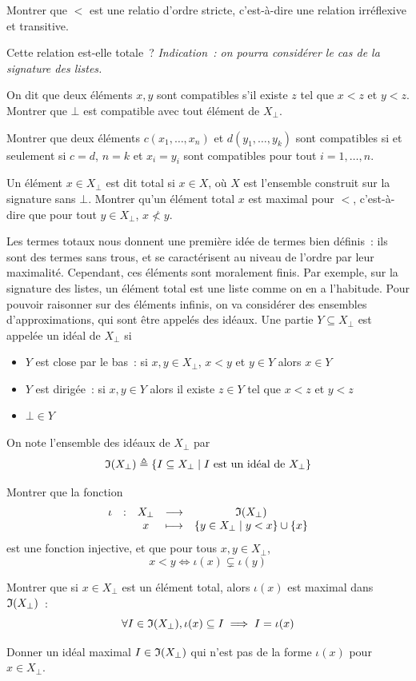 \begin{problem}[La coinduction]
  \begin{pbQuest}
  \item Montrer que $<$ est une relatio d'ordre stricte, c'est-à-dire une
    relation irréflexive et transitive.
  \item Cette relation est-elle totale~? \textit{Indication~: on pourra
    considérer le cas de la signature des listes.}
  \item On dit que deux éléments $x,y$ sont compatibles s'il existe $z$ tel que
    $x < z$ et $y < z$. Montrer que $\bot$ est compatible avec tout élément de
    $X_\bot$.
  \item Montrer que deux éléments $c(x_1,\ldots,x_n)$ et $d(y_1,\ldots,y_k)$
    sont compatibles si et seulement si $c = d$, $n = k$ et $x_i = y_i$ sont
    compatibles pour tout $i=1,\ldots,n$.
  \item Un élément $x\in X_\bot$ est dit total si $x \in X$, où $X$ est
    l'ensemble construit sur la signature sans $\bot$. Montrer qu'un
    élément total $x$ est maximal pour $<$, c'est-à-dire que pour tout
    $y\in X_\bot$, $x \nless y$.
  \end{pbQuest}

  Les termes totaux nous donnent une première idée de termes bien définis~: ils
  sont des termes sans trous, et se caractérisent au niveau de l'ordre par leur
  maximalité. Cependant, ces éléments sont moralement finis. Par exemple, sur la
  signature des listes, un élément total est une liste comme on en a l'habitude.
  Pour pouvoir raisonner sur des éléments infinis, on va considérer des
  ensembles d'approximations, qui sont être appelés des idéaux.
  Une partie $Y \subseteq X_\bot$ est appelée un idéal de $X_\bot$ si
  \begin{itemize}
  \item $Y$ est close par le bas~: si $x,y \in X_\bot$, $x < y$ et $y \in Y$
    alors $x \in Y$
  \item $Y$ est dirigée~: si $x,y \in Y$ alors il existe $z \in Y$ tel
    que $x < z$ et $y < z$
  \item $\bot \in Y$
  \end{itemize}
  
  \noindent
  On note l'ensemble des idéaux de $X_\bot$ par
  \[\mathfrak{I}(X_\bot) \triangleq \left\{ I \subseteq X_\bot \;\middle\vert\; I \text{ est un idéal de }
  X_\bot \right\}\]
  
  \begin{pbQuest}[resume]
  \item Montrer que la fonction
    \[\makeFun{\iota}{X_\bot}{\ideal(X_\bot)}{x}
              {\compr{ y \in X_\bot}{y < x}\cup\{x\}}\]
    est une fonction injective, et que pour tous $x,y \in X_\bot$,
    \[x < y \iff \iota(x) \subsetneq \iota(y)\]
  \item Montrer que si $x \in X_\bot$ est un élément total, alors $\iota(x)$
    est
    maximal dans $\mathfrak{I}(X_\bot)$~:
    \[\forall I \in \mathfrak{I}(X_\bot), \iota(x) \subseteq I \implies I =
    \iota(x)\]
  \item Donner un idéal maximal $I \in \mathfrak{I}(X_\bot)$ qui n'est pas de la
    forme $\iota(x)$ pour $x \in X_\bot$.
  \end{pbQuest}


\end{problem}
